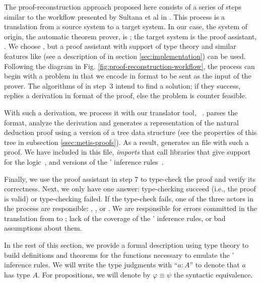 \documentclass[../main.tex]{subfiles}
\begin{document}
The proof-reconstruction approach proposed here consists of a series
of steps similar to the workflow presented by Sultana et al in
\cite{sultana2015}. This process is a translation from a source
system to a target system. In our case, the system of origin, the
automatic theorem prover, is \Metis; the target system is the proof
assistant, \Agda. We choose \Agda, but a proof assistant with
support of type theory and similar features like \Agda
(see a description of \Agda in section
\ref{sec:implementation}) can be used.
Following the diagram in Fig.
\ref{fig:proof-reconstruction-workflow}, the process can begin with
a problem in \CPL that we encode in \TPTP format to be sent as the
input of the \Metis prover.
The algorithms of \Metis in step~3 intend to find
a solution; if they success, \Metis replies a derivation in \TSTP
format of the proof, else the problem is counter feasible.

With such a derivation, we process it with our \Haskell translator
tool, \Athena~\cite{Athena}.
\Athena parses the \TSTP format, analyze the
derivation and generates a representation of the natural deduction
proof using a version of a tree data structure (see the properties
of this tree in subsection \ref{ssec:metis-proofs}). As a result,
\Athena generates an \Agda file with such a proof. We have included
in this file, \emph{imports} that call \Agda libraries that give
support for the logic~\cite{AgdaProp}, and versions of the \Metis'
inference rules~\cite{AgdaMetis}.

Finally, we use the proof assistant in step 7 to type-check the
proof and verify its correctness. Next, we only have one answer:
type-checking succeed (i.e., the proof is valid) or type-checking
failed.
If the type-check fails, one of the three actors in the process are
responsible: \Metis, \Athena, or \Agda. We are responsible for
errors committed in the translation from \TSTP to \Agda; lack of the
coverage of the \Metis' inference rules, or bad assumptions about
them. 

In the rest of this section, we provide a formal description using
type theory to build definitions and theorems for the functions
necessary to emulate the \Metis' inference rules. We will write the
type judgments with ``$a : A$'' to denote that $a$ has type $A$.
For propositions, we will denote by $φ ≡ ψ$ the syntactic
equivalence.


\end{document}
